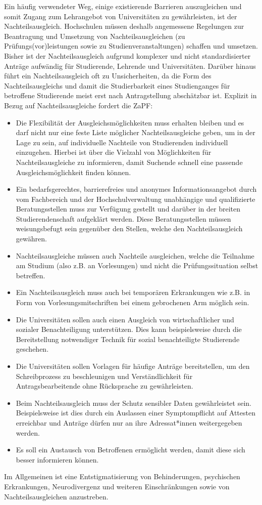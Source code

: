 \documentclass[DIV=calc]{scrartcl}
\begin{document}
Ein häufig verwendeter Weg, einige existierende Barrieren auszugleichen und somit Zugang zum Lehrangebot von Universitäten zu gewährleisten, ist der Nachteilsausgleich. Hochschulen müssen deshalb angemessene Regelungen zur Beantragung und Umsetzung von Nachteilsausgleichen (zu Prüfungs(vor)leistungen sowie zu Studienveranstaltungen) schaffen und umsetzen.\\
Bisher ist der Nachteilsausgleich aufgrund komplexer und nicht standardisierter Anträge aufwändig für Studierende, Lehrende und Universitäten. Darüber hinaus führt ein Nachteilsausgleich oft zu Unsicherheiten, da die Form des Nachteilsausgleichs und damit die Studierbarkeit eines Studienganges für betroffene Studierende meist erst nach Antragstellung abschätzbar ist. 
Explizit in Bezug auf Nachteilsausgleiche fordert die ZaPF:
\begin{itemize}
    \item Die Flexibilität der Ausgleichsmöglichkeiten muss erhalten bleiben und es darf nicht nur eine feste Liste möglicher Nachteilsausgleiche geben, um in der Lage zu sein, auf individuelle Nachteile von Studierenden individuell einzugehen. Hierbei ist über die Vielzahl von Möglichkeiten für Nachteilsausgleiche zu informieren, damit Suchende schnell eine passende Ausgleichsmöglichkeit finden können.
    \item Ein bedarfsgerechtes, barrierefreies und anonymes Informationsangebot durch vom Fachbereich und der Hochschulverwaltung unabhängige und qualifizierte Beratungsstellen muss zur Verfügung gestellt und darüber in der breiten Studierendenschaft aufgeklärt werden. Diese Beratungsstellen müssen weisungsbefugt sein gegenüber den Stellen, welche den Nachteilsausgleich gewähren.
    \item Nachteilsausgleiche müssen auch Nachteile ausgleichen, welche die Teilnahme am Studium (also z.B. an Vorlesungen) und nicht die Prüfungssituation selbst betreffen.
    \item Ein Nachteilsausgleich muss auch bei temporären Erkrankungen wie z.B. in Form von Vorlesungsmitschriften bei einem gebrochenen Arm möglich sein.
    \item Die Universitäten sollen auch einen Ausgleich von wirtschaftlicher und sozialer Benachteiligung unterstützen. Dies kann beispielsweise durch die Bereitstellung notwendiger Technik für sozial benachteiligte Studierende geschehen.
    \item Die Universitäten sollen Vorlagen für häufige Anträge bereitstellen, um den Schreibprozess zu beschleunigen und Verständlichkeit für Antragsbearbeitende ohne Rücksprache zu gewährleisten.
    \item Beim Nachteilsausgleich muss der Schutz sensibler Daten gewährleistet sein. Beispielsweise ist dies durch ein Auslassen einer Symptompflicht auf Attesten erreichbar und Anträge dürfen nur an ihre Adressat*innen weitergegeben werden.
    \item Es soll ein Austausch von Betroffenen ermöglicht werden, damit diese sich besser informieren können.
\end{itemize}
Im Allgemeinen ist eine Entstigmatisierung von Behinderungen, psychischen Erkrankungen, Neurodivergenz und weiteren Einschränkungen sowie von Nachteilsausgleichen anzustreben. 
\end{document}
